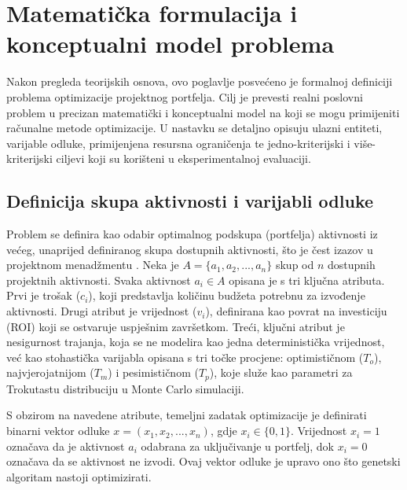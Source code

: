 \section{Matematička formulacija i konceptualni model problema}
\label{chap:model_problema}
Nakon pregleda teorijskih osnova, ovo poglavlje posvećeno je formalnoj definiciji problema optimizacije projektnog portfelja. Cilj je prevesti realni poslovni problem u precizan matematički i konceptualni model na koji se mogu primijeniti računalne metode optimizacije. U nastavku se detaljno opisuju ulazni entiteti, varijable odluke, primijenjena resursna ograničenja te jedno-kriterijski i više-kriterijski ciljevi koji su korišteni u eksperimentalnoj evaluaciji.
\subsection{Definicija skupa aktivnosti i varijabli odluke}
Problem se definira kao odabir optimalnog podskupa (portfelja) aktivnosti iz većeg, unaprijed definiranog skupa dostupnih aktivnosti, što je čest izazov u projektnom menadžmentu \cite{PMI2021, Kerzner2017}. Neka je $A=\{a_1, a_2, ..., a_n\}$ skup od $n$ dostupnih projektnih aktivnosti. Svaka aktivnost $a_i \in A$ opisana je s tri ključna atributa. Prvi je trošak ($c_i$), koji predstavlja količinu budžeta potrebnu za izvođenje aktivnosti. Drugi atribut je vrijednost ($v_i$), definirana kao povrat na investiciju (ROI) koji se ostvaruje uspješnim završetkom. Treći, ključni atribut je nesigurnost trajanja, koja se ne modelira kao jedna deterministička vrijednost, već kao stohastička varijabla opisana s tri točke procjene: optimističnom ($T_o$), najvjerojatnijom ($T_m$) i pesimističnom ($T_p$), koje služe kao parametri za Trokutastu distribuciju u Monte Carlo simulaciji.

S obzirom na navedene atribute, temeljni zadatak optimizacije je definirati binarni vektor odluke $x=(x_1, x_2, ..., x_n)$, gdje $x_i \in \{0,1\}$. Vrijednost $x_i=1$ označava da je aktivnost $a_i$ odabrana za uključivanje u portfelj, dok $x_i=0$ označava da se aktivnost ne izvodi. Ovaj vektor odluke je upravo ono što genetski algoritam nastoji optimizirati.

